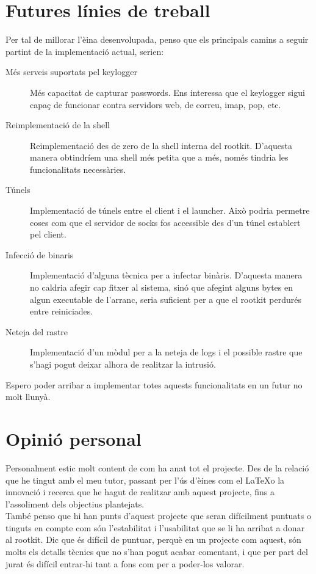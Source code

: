 \section{Futures línies de treball}

Per tal de millorar l'èina desenvolupada, penso que els principals camins a seguir partint de la 
implementació actual, serien:

\begin{description}
	\item[Més serveis suportats pel keylogger] Més capacitat de capturar passwords. Ens interessa que el keylogger sigui capaç
		de funcionar contra servidors web, de correu, imap, pop, etc.
	\item[Reimplementació de la shell] Reimplementació des de zero de la shell interna del rootkit. D'aquesta manera obtindríem
		una shell més petita que a més, només tindria les funcionalitats necessàries.  
	\item[Túnels] Implementació de túnels entre el client i el launcher. Això podria permetre coses com que el 
		servidor de socks fos accessible des d'un túnel establert pel client.
	\item[Infecció de binaris] Implementació d'alguna tècnica per a infectar binàris. D'aquesta manera no caldria afegir cap 
		fitxer al sistema, sinó que afegint alguns bytes en algun executable de l'arranc, seria suficient
		per a que el rootkit perdurés entre reiniciades.
	\item[Neteja del rastre] Implementació d'un mòdul per a la neteja de logs i el possible rastre que s'hagi pogut deixar
		alhora de realitzar la intrusió.
\end{description}

Espero poder arribar a implementar totes aquests funcionalitats en un futur no molt llunyà.

\section{Opinió personal}

Personalment estic molt content de com ha anat tot el projecte. Des de la relació que he tingut amb el
meu tutor, passant per l'ús d'èines com el \LaTeX  o la innovació i recerca que he hagut de realitzar amb aquest 
projecte, fins a l'assoliment dels objectius plantejats. \\

També penso que hi han punts d'aquest projecte que seran difícilment puntuats o tinguts en compte com 
són l'estabilitat i l'usabilitat que se li ha arribat a donar al rootkit. Dic que és difícil de puntuar, 
perquè en un projecte com aquest, són molts els detalls tècnics que no s'han pogut acabar comentant, i
que per part del jurat és difícil entrar-hi tant a fons com per a poder-los valorar. \\

